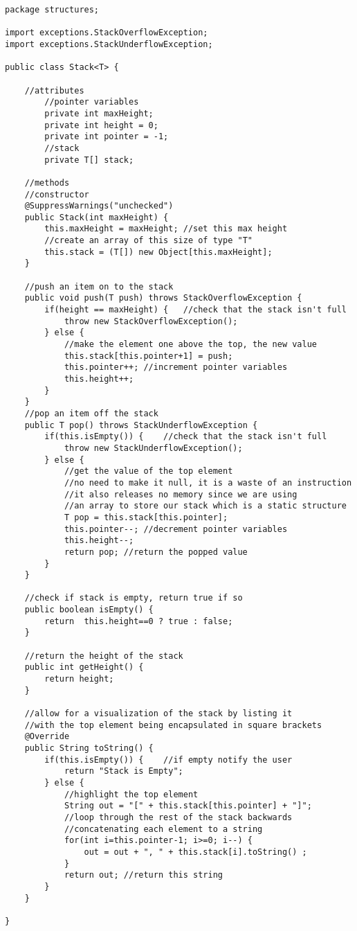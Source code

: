 \documentclass[../../../../main.tex]{subfiles}
\begin{document}
\begin{verbatim}
package structures;

import exceptions.StackOverflowException;
import exceptions.StackUnderflowException;

public class Stack<T> {
	
	//attributes
		//pointer variables
		private int maxHeight;
		private int height = 0;
		private int pointer = -1;
		//stack
		private T[] stack;
	
	//methods
	//constructor
	@SuppressWarnings("unchecked")
	public Stack(int maxHeight) {
		this.maxHeight = maxHeight;	//set this max height
		//create an array of this size of type "T"
		this.stack = (T[]) new Object[this.maxHeight];		
	}
	
	//push an item on to the stack
	public void push(T push) throws StackOverflowException {
		if(height == maxHeight) {	//check that the stack isn't full
			throw new StackOverflowException();
		} else {
			//make the element one above the top, the new value
			this.stack[this.pointer+1] = push; 
			this.pointer++;	//increment pointer variables
			this.height++;
		}
	}
	//pop an item off the stack
	public T pop() throws StackUnderflowException {
		if(this.isEmpty()) {	//check that the stack isn't full
			throw new StackUnderflowException();
		} else {
			//get the value of the top element
			//no need to make it null, it is a waste of an instruction
			//it also releases no memory since we are using
			//an array to store our stack which is a static structure
			T pop = this.stack[this.pointer];
			this.pointer--; //decrement pointer variables
			this.height--;
			return pop;	//return the popped value
		}
	}
	
	//check if stack is empty, return true if so
	public boolean isEmpty() {
		return  this.height==0 ? true : false;
	}
	
	//return the height of the stack
	public int getHeight() {
		return height;
	}

	//allow for a visualization of the stack by listing it
	//with the top element being encapsulated in square brackets
	@Override
	public String toString() {
		if(this.isEmpty()) {	//if empty notify the user
			return "Stack is Empty";
		} else {
			//highlight the top element
			String out = "[" + this.stack[this.pointer] + "]";
			//loop through the rest of the stack backwards
			//concatenating each element to a string
			for(int i=this.pointer-1; i>=0; i--) {
				out = out + ", " + this.stack[i].toString() ;
			}
			return out;	//return this string
		}
	}
	
}
\end{verbatim}
\end{document}
